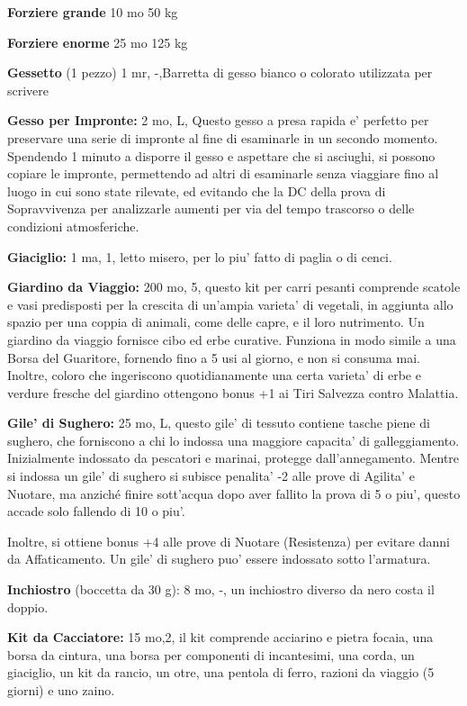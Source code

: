 \documentclass[a4paper,11pt,twoside,openany]{book}
\begin{document}
{		\textbf{Forziere grande} 10 mo 50 kg
		
		\textbf{Forziere enorme} 25 mo 125 kg
		
		\textbf{Gessetto} (1 pezzo) 1 mr, -,Barretta di gesso bianco o colorato utilizzata per scrivere
		
		\textbf{Gesso per Impronte:} 2 mo, L, Questo gesso a presa rapida e' perfetto per preservare una serie di impronte al fine di esaminarle in un secondo momento. Spendendo 1 minuto a disporre il gesso e aspettare che si asciughi, si possono copiare le impronte, permettendo ad altri di esaminarle senza viaggiare fino al luogo in cui sono state rilevate, ed evitando che la DC della prova di Sopravvivenza per analizzarle aumenti per via del tempo trascorso o delle condizioni atmosferiche. 
		
		\textbf{Giaciglio:} 1 ma, 1, letto misero, per lo piu' fatto di paglia o di cenci.
		
		\textbf{Giardino da Viaggio:} 200 mo, 5, questo kit per carri pesanti comprende scatole e vasi predispo­sti per la crescita di un'ampia varieta' di vegetali, in aggiunta allo spazio per una coppia di animali, come delle capre, e il loro nutrimento. Un giardino da viaggio fornisce cibo ed erbe curative. Funziona in modo simile a una Borsa del Guaritore, fornendo fino a 5 usi al giorno, e non si consuma mai. Inoltre, coloro che ingeriscono quotidianamente una certa varieta' di ­erbe e verdure fresche del giardino ottengono bonus +1 ai Tiri Salvezza contro Malattia. 
		
		\textbf{Gile' di Sughero:} 25 mo, L, questo gile' di tessuto contiene tasche piene di sughero, che forniscono a chi lo indossa una maggiore capacita' di galleggiamento. Inizialmente indossato da pescatori e marinai, protegge dall'annegamento. Mentre si indossa un gile' di sughero si subisce penalita' -2 alle prove di Agilita' e Nuotare, ma anziché finire sott'acqua dopo aver fallito la prova di 5 o piu', questo accade solo fallendo di 10 o piu'. 
		
		Inoltre, si ottiene bonus +4 alle prove di Nuotare (Resistenza) per evitare danni da Affaticamento. Un gile' di sughero puo' essere indossato sotto l'armatura.
		
		\textbf{Inchiostro} (boccetta da 30 g): 8 mo, -, un inchiostro diverso da nero costa il doppio.
		
		\textbf{Kit da Cacciatore:} 15 mo,2, il kit comprende acciarino e pietra focaia, una borsa da cin­tura, una borsa per componenti di incantesimi, una corda, un giaciglio, un kit da rancio, un otre, una pentola di ferro, razioni da viaggio (5 giorni) e uno zaino.
		
}
\end{document}
